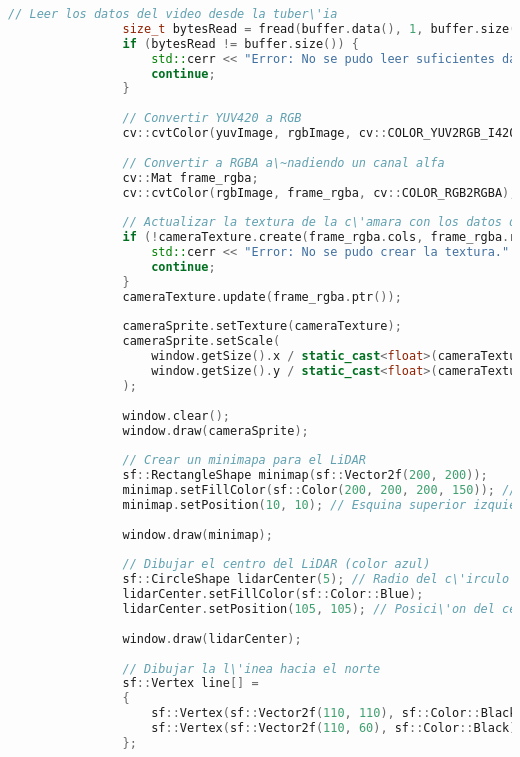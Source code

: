 \begin{lstlisting}[language={C++}, caption={Primera versi\'on del c\'odigo del sistema de control del robot}, label={Script}]
                // Leer los datos del video desde la tuber\'ia
                size_t bytesRead = fread(buffer.data(), 1, buffer.size(), pipe);
                if (bytesRead != buffer.size()) {
                    std::cerr << "Error: No se pudo leer suficientes datos de video." << std::endl;
                    continue;
                }
        
                // Convertir YUV420 a RGB
                cv::cvtColor(yuvImage, rgbImage, cv::COLOR_YUV2RGB_I420);
        
                // Convertir a RGBA a\~nadiendo un canal alfa
                cv::Mat frame_rgba;
                cv::cvtColor(rgbImage, frame_rgba, cv::COLOR_RGB2RGBA);
        
                // Actualizar la textura de la c\'amara con los datos del frame
                if (!cameraTexture.create(frame_rgba.cols, frame_rgba.rows)) {
                    std::cerr << "Error: No se pudo crear la textura." << std::endl;
                    continue;
                }
                cameraTexture.update(frame_rgba.ptr());
        
                cameraSprite.setTexture(cameraTexture);
                cameraSprite.setScale(
                    window.getSize().x / static_cast<float>(cameraTexture.getSize().x),
                    window.getSize().y / static_cast<float>(cameraTexture.getSize().y)
                );
        
                window.clear();
                window.draw(cameraSprite);
        
                // Crear un minimapa para el LiDAR
                sf::RectangleShape minimap(sf::Vector2f(200, 200));
                minimap.setFillColor(sf::Color(200, 200, 200, 150)); // Fondo semitransparente
                minimap.setPosition(10, 10); // Esquina superior izquierda
        
                window.draw(minimap);
        
                // Dibujar el centro del LiDAR (color azul)
                sf::CircleShape lidarCenter(5); // Radio del c\'irculo del LiDAR
                lidarCenter.setFillColor(sf::Color::Blue);
                lidarCenter.setPosition(105, 105); // Posici\'on del centro en el minimapa
        
                window.draw(lidarCenter);
        
                // Dibujar la l\'inea hacia el norte
                sf::Vertex line[] =
                {
                    sf::Vertex(sf::Vector2f(110, 110), sf::Color::Black),
                    sf::Vertex(sf::Vector2f(110, 60), sf::Color::Black) // L\'inea hacia arriba (norte)
                };
        

\end{lstlisting}
